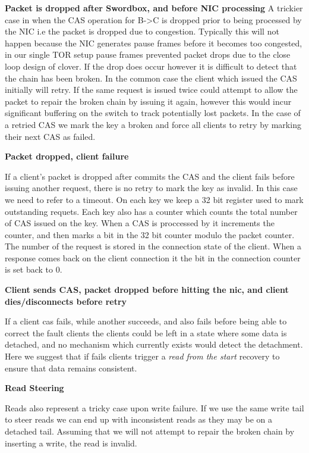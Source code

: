 \textbf{Packet is dropped after Swordbox, and before NIC processing}
A trickier case in when the CAS operation for B->C is dropped prior to being
processed by the NIC i.e the packet is dropped due to congestion. Typically this
will not happen because the NIC generates pause frames before it becomes too
congested, in our single TOR setup pause frames prevented packet drops due to
the close loop design of clover. If the drop does occur however it is difficult
to detect that the chain has been broken. In the common case the client which
issued the CAS initially will retry.  If the same
request is issued twice {\sword} could attempt to allow the packet to repair the
broken chain by issuing it again, however this would incur significant buffering
on the switch to track potentially lost packets. In the case of a retried CAS we
mark the key a broken and force all clients to retry by marking their next CAS
as failed.

\textbf{Packet dropped, client failure}

If a client's packet is dropped after \sword commits the CAS and the client
fails before issuing another request, there is no retry to mark the key as
invalid. In this case we need to refer to a timeout. On each key we keep a 32
bit register used to mark outstanding requets. Each key also has a counter which
counts the total number of CAS issued on the key. When a CAS is proccessed by
\sword it increments the counter, and then marks a bit in the 32 bit counter
modulo the packet counter. The number of the request is stored in the connection
state of the client. When a response comes back on the client connection it the
bit in the connection counter is set back to 0.

\textbf{Client sends CAS, packet dropped before hitting the nic, and client
dies/disconnects before retry}

If a client cas fails, while another succeeds, and {\sword} also fails before
being able to correct the fault clients the clients could be left in a state
where some data is detached, and no mechanism which currently exists would
detect the detachment. Here we suggest that if {\sword} fails clients trigger a
\textit{read from the start} recovery to ensure that data remains consistent.


\textbf{Read Steering}

Reads also represent a tricky case upon write failure. If we use the same write
tail to steer reads we can end up with inconsistent reads as they may be on a
detached tail. Assuming that we will not attempt to repair the broken chain by
inserting a write, the read is invalid.

